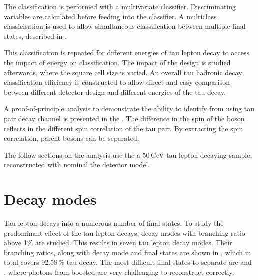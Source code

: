 The classification is performed with a multivariate classifier. Discriminating variables are calculated before feeding into the classifier.  A multiclass classicisation is used to allow simultaneous classification between  multiple final states, described in \Section{}.

This classification is repeated for different energies of tau lepton decay to access the impact of energy on classification. The impact of the \ECAL design is studied afterwards, where the \ECAL square cell size is varied. An overall tau hadronic decay classification efficiency is constructed to allow direct and easy comparison between different detector design and different energies of the tau decay.

A proof-of-principle analysis to demonstrate the ability to identify \PHiggs from \PZ using  tau pair decay channel is presented in the \Section{}. The difference in the spin of the boson reflects in the different spin correlation of the tau pair. By extracting the spin correlation, parent bosons can be separated.

The follow sections on the analysis use the a 50\,GeV tau lepton decaying sample, reconstructed with nominal the \ILD detector model.

\section{Decay modes}
\label{sec:tauDecayModes}
Tau lepton decays into a numerous number of final states. To study the predominant effect of the tau lepton decays, decay modes with branching ratio above 1\% are studied. This results in seven tau lepton decay modes. Their branching ratios, along with decay mode and final states are  shown in , which in total covers 92.58\,\% tau decay. The most difficult final states to separate are \decayRhoFinalStateShort and \decayAiPhotonFinalStateShort, where photons from boosted \Ppizero are very challenging to reconstruct correctly.

